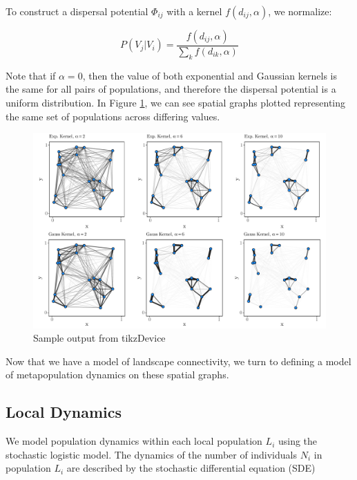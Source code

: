 \documentclass[]{article}
\begin{document}
To construct a dispersal potential $\Phi_{ij}$ with a kernel $f(d_{ij}, \alpha)$,  we normalize:

\[P(V_j|V_i)=\frac{f(d_{ij}, \alpha)}{\sum_k f(d_{ik},\alpha)}\]

Note that if \(\alpha=0\), then the value of both exponential and
Gaussian kernels is the same for all pairs of populations, and therefore
the dispersal potential is a uniform distribution. In Figure \ref{fig:mp},
we can see spatial graphs plotted representing the same set of
populations across differing values.


\begin{figure}
	    \centering
		\includegraphics[width=15cm]{./figs/figure1}
		\caption{Sample output from tikzDevice}	\label{fig:mp}
\end{figure}

Now that we have a model of landscape connectivity, we turn to defining a model of metapopulation dynamics on these spatial graphs.


\hypertarget{local-dynamics}{%
\subsection{Local Dynamics}\label{local-dynamics}}

We model population dynamics within each local population $L_i$ using
the stochastic logistic model. The dynamics of the number of individuals $N_i$
in population $L_i$  are described by the stochastic differential
equation (SDE)
\end{document}
